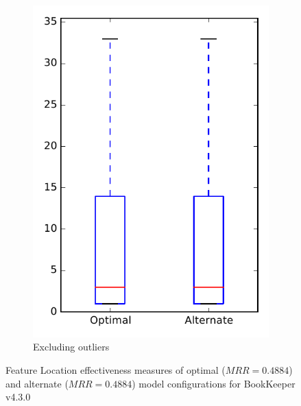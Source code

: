 \begin{figure}
\begin{subfigure}{.4\textwidth}
        \includegraphics[height=0.4\textheight]{figures/combo/flt_rq1_bookkeeper_no_outlier}
        \caption{Excluding outliers}\label{fig:combo:flt:rq1:bookkeeper_no_outlier}
    \end{subfigure}
\caption[Feature Location effectiveness measures of optimal and alternate model configurations for BookKeeper v4.3.0]%
{Feature Location effectiveness measures of optimal ($MRR=0.4884$) and alternate ($MRR=0.4884$) model configurations for BookKeeper v4.3.0}
\label{fig:combo:flt:rq1:bookkeeper}
\end{figure}
